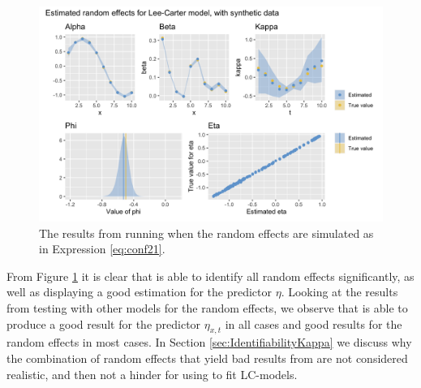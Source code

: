 \begin{figure}[h!]
    \centering
    \includegraphics[width=0.85\linewidth]{synthetic-data/Figures/effects-LC-synthetic.png}
    \caption{The results from running \inlabru when the random effects are simulated as in Expression \ref{eq:conf21}.}
    \label{fig:firstRun}
\end{figure}
From Figure \ref{fig:firstRun} it is clear that \inlabru is able to identify all random effects significantly, as well as displaying a good estimation for the predictor $\eta$. Looking at the results from testing \inlabru with other models for the random effects, we observe that \inlabru is able to produce a good result for the predictor $\eta_{x,t}$ in all cases and good results for the random effects in most cases. In Section \ref{sec:IdentifiabilityKappa} we discuss why the combination of random effects that yield bad results from \inlabru are not considered realistic, and then not a hinder for using \inlabru to fit LC-models. 

